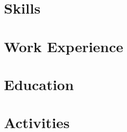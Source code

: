 \documentclass[letter,12pt]{article}
\begin{document}
%

\section{Skills}


\section{Work Experience}


\section{Education}



\section{Activities}

\end{document}
